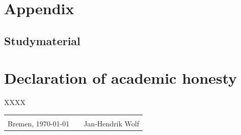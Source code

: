 \documentclass[12pt,numbers=noenddot,parskip,bibliography=totocnumbered,listof=totocnumbered,draft=true]{scrreprt}
\begin{document}
\appendix
\chapter{Appendix}
\newpage
\section{Studymaterial}
\vfill
\label{lab:Studymaterial}
\vfill

\clearpage
{}



\listoffigures

\chapter*{Declaration of academic honesty}
\thispagestyle{empty}
XXXX
\begin{center}
\begin{tabular}{lp{2em}l} 
 \hspace{5cm}   && \hspace{4cm} \\\cline{1-1}\cline{3-3} 
 Bremen, \today    && Jan-Hendrik Wolf 
\end{tabular} 
\end{center}
\end{document}
